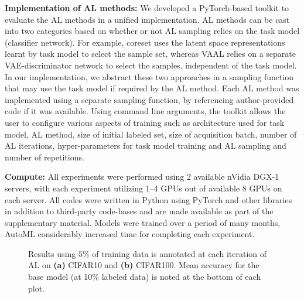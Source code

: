 \documentclass[10pt,twocolumn,letterpaper]{article}
\begin{document}
\noindent \textbf{Implementation of AL methods:} We developed a PyTorch-based toolkit to evaluate the AL methods in a unified implementation. AL methods can be cast into two categories based on whether or not AL sampling relies on the task model (classifier network). For example, coreset uses the latent space representations learnt by task model to select the sample set, whereas VAAL relies on a separate VAE-discriminator network to select the samples, independent of the task model. In our implementation, we abstract these two approaches in a sampling function that may use the task model if required by the AL method. Each AL method was implemented using a separate sampling function, by referencing author-provided code if it was available. Using command line arguments, the toolkit allows the user to configure various aspects of training such as architecture used for task model, AL method, size of initial labeled set, size of acquisition batch, number of AL iterations, hyper-parameters for task model training and AL sampling and number of repetitions. 
\vspace{-0.39em}

\noindent \textbf{Compute:} All experiments were performed using 2 available nVidia DGX-1 servers, with each experiment utilizing 1--4 GPUs out of available 8 GPUs on each server. All codes were written in Python using PyTorch and other libraries in addition to third-party code-bases and are made available as part of the supplementary material. Models were trained over a period of many months, AutoML considerably increased time for completing each experiment.


























\begin{figure*}[t]
\begin{center}
  \vspace{-1em}
\end{center}
    \caption{Results using $5\%$ of training data is annotated at each iteration of AL on \textbf{(a)} CIFAR10 and \textbf{(b)} CIFAR100. Mean accuracy for the base model (at 10\% labeled data) is noted at the bottom of each plot.}
    
\label{fig:cifar_budgetsize_exp}
  \vspace{-1em}
\end{figure*}
\end{document}
